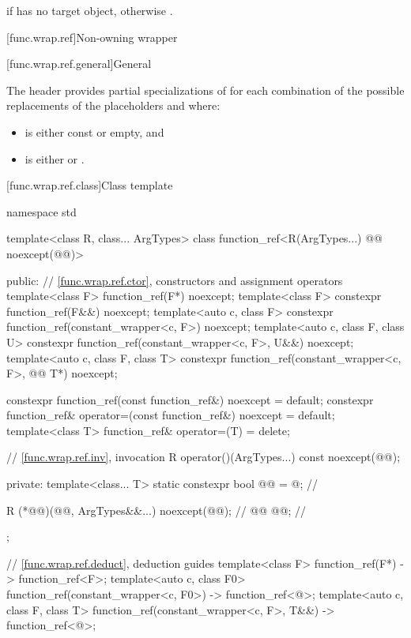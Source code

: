 \begin{itemdescr}
\pnum
\returns
{} if  has no target object, otherwise .
\end{itemdescr}

[func.wrap.ref]{Non-owning wrapper}

[func.wrap.ref.general]{General}

\pnum
The header provides partial specializations of 
for each combination of the possible replacements of
the placeholders \cv{} and  where:

\begin{itemize}
\item \cv{} is either const or empty, and
\item {} is either  or .
\end{itemize}

[func.wrap.ref.class]{Class template }

%
\begin{codeblock}
namespace std {
  template<class R, class... ArgTypes>
  class function_ref<R(ArgTypes...) @\cv{}@ noexcept(@@)> {
  public:
    // \ref{func.wrap.ref.ctor}, constructors and assignment operators
    template<class F> function_ref(F*) noexcept;
    template<class F> constexpr function_ref(F&&) noexcept;
    template<auto c, class F> constexpr function_ref(constant_wrapper<c, F>) noexcept;
    template<auto c, class F, class U> constexpr function_ref(constant_wrapper<c, F>, U&&) noexcept;
    template<auto c, class F, class T> constexpr function_ref(constant_wrapper<c, F>, @\cv{}@ T*) noexcept;

    constexpr function_ref(const function_ref&) noexcept = default;
    constexpr function_ref& operator=(const function_ref&) noexcept = default;
    template<class T> function_ref& operator=(T) = delete;

    // \ref{func.wrap.ref.inv}, invocation
    R operator()(ArgTypes...) const noexcept(@@);

  private:
    template<class... T>
      static constexpr bool @@ = @\seebelownc@;             // \expos

    R (*@@)(@@, ArgTypes&&...) noexcept(@@);      // \expos
    @@ @@;                                       // \expos
  };

  // \ref{func.wrap.ref.deduct}, deduction guides
  template<class F>
    function_ref(F*) -> function_ref<F>;
  template<auto c, class F0>
    function_ref(constant_wrapper<c, F0>) -> function_ref<@\seebelow@>;
  template<auto c, class F, class T>
    function_ref(constant_wrapper<c, F>, T&&) -> function_ref<@\seebelow@>;
}
\end{codeblock}

